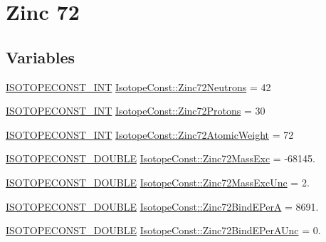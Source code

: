 \hypertarget{group___isotope_const-_zinc-_zn72}{}\section{Zinc 72}
\label{group___isotope_const-_zinc-_zn72}
\subsection*{Variables}
\begin{DoxyCompactItemize}
\item 
\mbox{\hyperlink{group___isotope_const-_macros_ga5f18360b3e99483a35c32d789e62621c}{I\+S\+O\+T\+O\+P\+E\+C\+O\+N\+S\+T\+\_\+\+I\+NT}} \mbox{\hyperlink{group___isotope_const-_zinc-_zn72_ga602f6971a2724862ce7719513f9646bb}{Isotope\+Const\+::\+Zinc72\+Neutrons}} = 42
\item 
\mbox{\hyperlink{group___isotope_const-_macros_ga5f18360b3e99483a35c32d789e62621c}{I\+S\+O\+T\+O\+P\+E\+C\+O\+N\+S\+T\+\_\+\+I\+NT}} \mbox{\hyperlink{group___isotope_const-_zinc-_zn72_gac96ebfdb2780202234dd0709aacc2e2b}{Isotope\+Const\+::\+Zinc72\+Protons}} = 30
\item 
\mbox{\hyperlink{group___isotope_const-_macros_ga5f18360b3e99483a35c32d789e62621c}{I\+S\+O\+T\+O\+P\+E\+C\+O\+N\+S\+T\+\_\+\+I\+NT}} \mbox{\hyperlink{group___isotope_const-_zinc-_zn72_ga6530fb89a78151fb94d7c5ca8c442607}{Isotope\+Const\+::\+Zinc72\+Atomic\+Weight}} = 72
\item 
\mbox{\hyperlink{group___isotope_const-_macros_ga8f45a7272ce02c0b4c65c44636ed719a}{I\+S\+O\+T\+O\+P\+E\+C\+O\+N\+S\+T\+\_\+\+D\+O\+U\+B\+LE}} \mbox{\hyperlink{group___isotope_const-_zinc-_zn72_ga53e65e231ed454e484b6646b8bdcef73}{Isotope\+Const\+::\+Zinc72\+Mass\+Exc}} = -\/68145.
\item 
\mbox{\hyperlink{group___isotope_const-_macros_ga8f45a7272ce02c0b4c65c44636ed719a}{I\+S\+O\+T\+O\+P\+E\+C\+O\+N\+S\+T\+\_\+\+D\+O\+U\+B\+LE}} \mbox{\hyperlink{group___isotope_const-_zinc-_zn72_gacc94748358df663d39baa33c4cf189b1}{Isotope\+Const\+::\+Zinc72\+Mass\+Exc\+Unc}} = 2.
\item 
\mbox{\hyperlink{group___isotope_const-_macros_ga8f45a7272ce02c0b4c65c44636ed719a}{I\+S\+O\+T\+O\+P\+E\+C\+O\+N\+S\+T\+\_\+\+D\+O\+U\+B\+LE}} \mbox{\hyperlink{group___isotope_const-_zinc-_zn72_ga42a9ac6ba24f1cd98019ab984450b476}{Isotope\+Const\+::\+Zinc72\+Bind\+E\+PerA}} = 8691.
\item 
\mbox{\hyperlink{group___isotope_const-_macros_ga8f45a7272ce02c0b4c65c44636ed719a}{I\+S\+O\+T\+O\+P\+E\+C\+O\+N\+S\+T\+\_\+\+D\+O\+U\+B\+LE}} \mbox{\hyperlink{group___isotope_const-_zinc-_zn72_ga1d13a3fd1c350fa60fad4761050b39a5}{Isotope\+Const\+::\+Zinc72\+Bind\+E\+Per\+A\+Unc}} = 0.

\end{DoxyCompactItemize}
